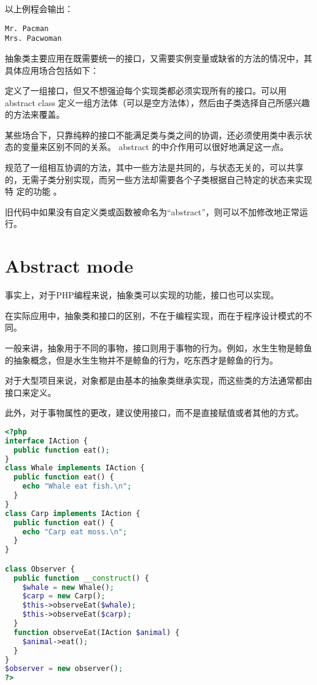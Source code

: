 以上例程会输出：

\begin{verbatim}
Mr. Pacman
Mrs. Pacwoman
\end{verbatim}

抽象类主要应用在既需要统一的接口，又需要实例变量或缺省的方法的情况中，其具体应用场合包括如下：

\begin{compactenum}
\item 定义了一组接口，但又不想强迫每个实现类都必须实现所有的接口。可以用 abstract class 定义一组方法体（可以是空方法体），然后由子类选择自己所感兴趣的方法来覆盖。
\item 某些场合下，只靠纯粹的接口不能满足类与类之间的协调，还必须使用类中表示状态的变量来区别不同的关系。 abstract 的中介作用可以很好地满足这一点。
\item 规范了一组相互协调的方法，其中一些方法是共同的，与状态无关的，可以共享的，无需子类分别实现，而另一些方法却需要各个子类根据自己特定的状态来实现特 定的功能 。
\end{compactenum}

旧代码中如果没有自定义类或函数被命名为“abstract”，则可以不加修改地正常运行。


\section{Abstract mode}

事实上，对于PHP编程来说，抽象类可以实现的功能，接口也可以实现。

在实际应用中，抽象类和接口的区别，不在于编程实现，而在于程序设计模式的不同。

一般来讲，抽象用于不同的事物，接口则用于事物的行为。例如，水生生物是鲸鱼的抽象概念，但是水生生物并不是鲸鱼的行为，吃东西才是鲸鱼的行为。

对于大型项目来说，对象都是由基本的抽象类继承实现，而这些类的方法通常都由接口来定义。


此外，对于事物属性的更改，建议使用接口，而不是直接赋值或者其他的方式。



\begin{lstlisting}[language=PHP]
<?php
interface IAction {
  public function eat();
}
class Whale implements IAction {
  public function eat() {
    echo "Whale eat fish.\n";
  }
}
class Carp implements IAction {
  public function eat() {
    echo "Carp eat moss.\n";
  }
}

class Observer {
  public function __construct() {
    $whale = new Whale();
    $carp = new Carp();
    $this->observeEat($whale);
    $this->observeEat($carp);
  }
  function observeEat(IAction $animal) {
    $animal->eat();
  }
}
$observer = new observer();
?>
\end{lstlisting}

